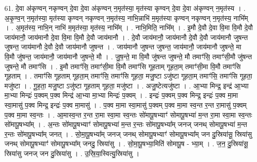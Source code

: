 \documentclass[17pt]{extarticle}
\begin{document}
61. दे॒वा अ॑कृण्वन् नकृण्वन् दे॒वा दे॒वा अ॑कृण्वन् न॒मृत॑स्या॒ मृत॑स्या कृण्वन् दे॒वा दे॒वा अ॑कृण्वन् न॒मृत॑स्य । . अ॒कृ॒ण्व॒न् न॒मृत॑स्या॒ मृत॑स्या कृण्वन् नकृण्वन् न॒मृत॑स्य॒ नाभि॒न्नाभि॑ म॒मृत॑स्या कृण्वन् नकृण्वन् न॒मृत॑स्य॒ नाभि᳚म् । . अ॒मृत॑स्य॒ नाभि॒न् नाभि॑ म॒मृत॑स्या॒ मृत॑स्य॒ नाभि᳚म् । . नाभि॒मिति॒ नाभि᳚म् । . इ॒मौ दे॒वौ दे॒वा वि॒मा वि॒मौ दे॒वौ जाय॑मानौ॒ जाय॑मानौ दे॒वा वि॒मा वि॒मौ दे॒वौ जाय॑मानौ । . दे॒वौ जाय॑मानौ॒ जाय॑मानौ दे॒वौ दे॒वौ जाय॑मानौ जुषन्त जुषन्त॒ जाय॑मानौ दे॒वौ दे॒वौ जाय॑मानौ जुषन्त । . जाय॑मानौ जुषन्त जुषन्त॒ जाय॑मानौ॒ जाय॑मानौ जुषन्ते॒ मा वि॒मौ जु॑षन्त॒ जाय॑मानौ॒ जाय॑मानौ जुषन्ते॒ मौ । . जु॒ष॒न्ते॒ मा वि॒मौ जु॑षन्त जुषन्ते॒ मौ तमाꣳ॑सि॒ तमाꣳ॑सी॒मौ जु॑षन्त जुषन्ते॒ मौ तमाꣳ॑सि । . इ॒मौ तमाꣳ॑सि॒ तमाꣳ॑सी॒मा वि॒मौ तमाꣳ॑सि गूहताम् गूहता॒म् तमाꣳ॑सी॒मा वि॒मौ तमाꣳ॑सि गूहताम् । . तमाꣳ॑सि गूहताम् गूहता॒म् तमाꣳ॑सि॒ तमाꣳ॑सि गूहता॒ मजु॒ष्टा ऽजु॑ष्टा गूहता॒म् तमाꣳ॑सि॒ तमाꣳ॑सि गूहता॒ मजु॑ष्टा । . गू॒ह॒ता॒ मजु॒ष्टा ऽजु॑ष्टा गूहताम् गूहता॒ मजु॑ष्टा । . अजु॒ष्टेत्यजु॑ष्टा । . आ॒भ्या मिन्द्र॒ इन्द्र॑ आ॒भ्या मा॒भ्या मिन्द्रः॑ प॒क्वम् प॒क्व मिन्द्र॑ आ॒भ्या मा॒भ्या मिन्द्रः॑ प॒क्वम् । . इन्द्रः॑ प॒क्वम् प॒क्व मिन्द्र॒ इन्द्रः॑ प॒क्व मा॒मा स्वा॒मासु॑ प॒क्व मिन्द्र॒ इन्द्रः॑ प॒क्व मा॒मासु॑ । . प॒क्व मा॒मा स्वा॒मासु॑ प॒क्वम् प॒क्व मा॒मा स्व॒न्त र॒न्त रा॒मासु॑ प॒क्वम् प॒क्व मा॒मा स्व॒न्तः । . आ॒मास्व॒न्त र॒न्त रा॒मा स्वा॒मा स्व॒न्तः सो॑मापू॒षभ्याꣳ॑ सोमापू॒षभ्या॑ म॒न्त रा॒मा स्वा॒मा स्व॒न्तः सो॑मापू॒षभ्या᳚म् । . अ॒न्तः सो॑मापू॒षभ्याꣳ॑ सोमापू॒षभ्या॑ म॒न्त र॒न्तः सो॑मापू॒षभ्या᳚म् जनज् जनथ् सोमापू॒षभ्या॑ म॒न्त र॒न्तः सो॑मापू॒षभ्या᳚म् जनत् । . सो॒मा॒पू॒षभ्या᳚म् जनज् जनथ् सोमापू॒षभ्याꣳ॑ सोमापू॒षभ्या᳚म् जन दु॒स्रिया॑सू॒ स्रिया॑सु जनथ् सोमापू॒षभ्याꣳ॑ सोमापू॒षभ्या᳚म् जनदु॒ स्रिया॑सु । . सो॒मा॒पू॒षभ्या॒मिति॑ सोमापू॒ष - भ्या॒म् । . ज॒न॒ दु॒स्रिया॑सू॒ स्रिया॑सु जनज् जन दु॒स्रिया॑सु । . उ॒स्रि॒या॒स्वित्यु॒स्रिया॑सु । \newline
\pagebreak
\end{document}
